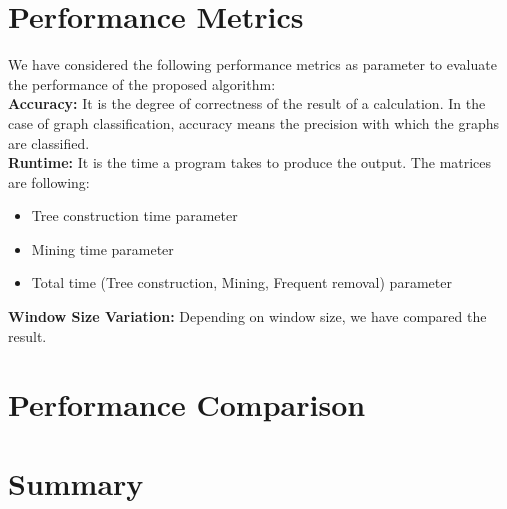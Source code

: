 

%
\section{Performance Metrics}
%
We have considered the following performance metrics as parameter to evaluate the performance of the proposed algorithm:\\
\textbf{Accuracy:} It is the degree of correctness of the result of a calculation. In the case of graph classification, accuracy means the precision with which the graphs are classified.\\
\textbf{Runtime:} It is the time a program takes to produce the output. The matrices are following:
\begin{itemize}
\item Tree construction time parameter
\item Mining time parameter
\item Total time (Tree construction, Mining, Frequent removal) parameter
\end {itemize}
\textbf{Window Size Variation:} Depending on window size, we have compared the result. \\
%
\section{Performance Comparison}
%
%
\section{Summary}
%
